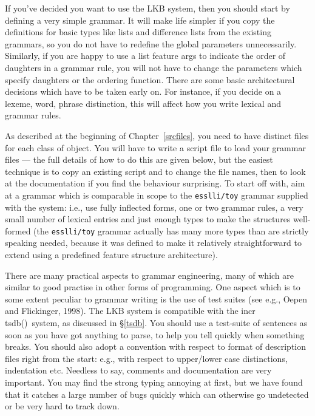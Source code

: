 \documentclass[12pt]{report}
\newcommand{\itsdb}{{\sf \lbrack incr tsdb()\rbrack}}
\newcommand{\filename}[1]{{\tt #1}}
\begin{document}
If you've decided you want to use the LKB system, then you should start by
defining a very simple grammar.  
It will make life simpler 
if you copy the definitions for basic types like lists and difference
lists from the existing grammars, so you do not have to redefine the
global parameters unnecessarily.  
Similarly, if you are happy to use a list feature {\feature args} to
indicate the order of daughters in a grammar rule, you will not
have to change the parameters which specify daughters or the
ordering function.
There are some basic architectural decisions
which have to be taken early on.  For instance, if you decide
on a {\type lexeme}, {\type word}, {\type phrase} distinction, this will
affect how you write lexical and grammar rules.  

As described at the beginning of Chapter~\ref{srcfiles},
you need to have distinct files for each class of object. 
You will have to write a script 
file to load your grammar files --- the full details of how to
do this are given below, but the easiest technique is to copy
an existing script and to change the file names, then to look at the
documentation if you find the behaviour surprising.  To start off
with, aim at a grammar which is comparable in scope to the
\filename{esslli/toy} grammar
supplied with the system: i.e., use fully inflected forms, 
one or two grammar rules, a very small number
of lexical entries and just enough types to make the structures well-formed
(the \filename{esslli/toy}
grammar actually has many more types than are strictly 
speaking needed, because it was defined 
to make it relatively straightforward
to extend using a predefined feature structure architecture).

There are many practical aspects to grammar engineering, many of which
are similar to good practise in other forms of programming.
One aspect which is to some extent peculiar to grammar writing is the
use of test suites (see e.g., Oepen and Flickinger, 1998).
The LKB system is compatible with the \itsdb\  system, as discussed
in \S\ref{tsdb}.
You should use a test-suite of sentences as soon as you have got
anything to parse, to
help you tell quickly when something breaks.  You should also
adopt a convention with respect to format of description files right
from the start: e.g., with respect to upper/lower case distinctions,
indentation etc.  Needless to say, comments 
and documentation are very important.  
You may find the strong typing annoying at first, but we have found that
it catches a large number of bugs quickly which can otherwise go undetected
or be very hard to track down.  
\end{document}
